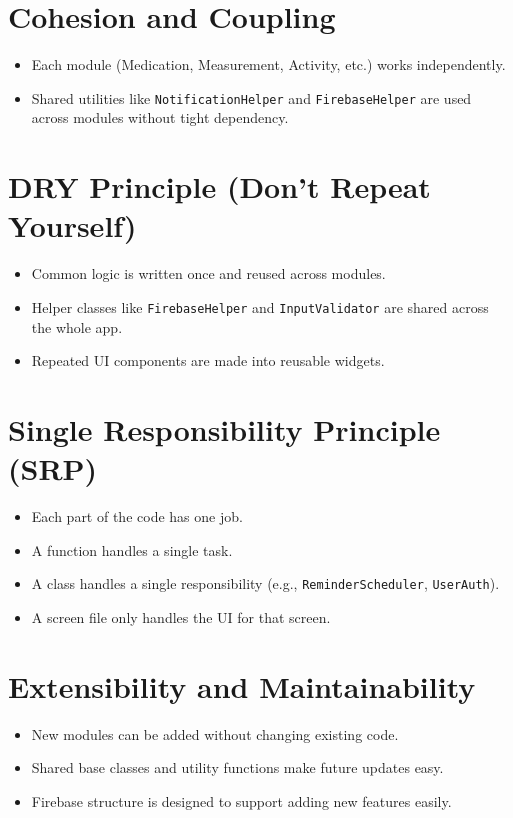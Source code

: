 \documentclass[12pt, a4paper, oneside]{report}
\begin{document}
\section{Cohesion and Coupling}
\begin{itemize}
    \item Each module (Medication, Measurement, Activity, etc.) works independently.
    \item Shared utilities like \texttt{NotificationHelper} and \texttt{FirebaseHelper} are used across modules without tight dependency.
\end{itemize}

\section{DRY Principle (Don't Repeat Yourself)}
\begin{itemize}
    \item Common logic is written once and reused across modules.
    \item Helper classes like \texttt{FirebaseHelper} and \texttt{InputValidator} are shared across the whole app.
    \item Repeated UI components are made into reusable widgets.
\end{itemize}

\section{Single Responsibility Principle (SRP)}
\begin{itemize}
    \item Each part of the code has one job.
    \item A function handles a single task.
    \item A class handles a single responsibility (e.g., \texttt{ReminderScheduler}, \texttt{UserAuth}).
    \item A screen file only handles the UI for that screen.
\end{itemize}

\section{Extensibility and Maintainability}
\begin{itemize}
    \item New modules can be added without changing existing code.
    \item Shared base classes and utility functions make future updates easy.
    \item Firebase structure is designed to support adding new features easily.
\end{itemize}
\end{document}
